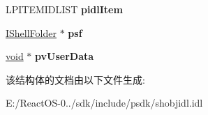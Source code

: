 \begin{DoxyCompactItemize}
\item 
\mbox{\label{structtag_s_m_d_a_t_a_ab7ef435cf1f3fe1a2fdb48b7cc2baa42}} 
L\+P\+I\+T\+E\+M\+I\+D\+L\+I\+ST {\bfseries pidl\+Item}
\item 
\mbox{\label{structtag_s_m_d_a_t_a_abb5880a2cb44a7da327e097215e0b66e}} 
\hyperlink{interface_i_shell_folder}{I\+Shell\+Folder} $\ast$ {\bfseries psf}
\item 
\mbox{\label{structtag_s_m_d_a_t_a_a8c8aa814bfe5e523a2263ecff6d80ccf}} 
\hyperlink{interfacevoid}{void} $\ast$ {\bfseries pv\+User\+Data}
\end{DoxyCompactItemize}


该结构体的文档由以下文件生成\+:\begin{DoxyCompactItemize}
\item 
E\+:/\+React\+O\+S-\/0../sdk/include/psdk/shobjidl.\+idl\end{DoxyCompactItemize}
